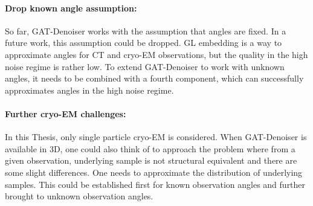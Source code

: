 \paragraph{Drop known angle assumption:}
So far, GAT-Denoiser works with the assumption that angles are fixed.
In a future work, this assumption could be dropped. GL embedding
is a way to approximate angles for CT and cryo-EM observations, but the quality in the high noise regime is rather low.
To extend GAT-Denoiser to work with unknown angles, it needs to be combined with a fourth component, 
which can successfully approximates angles in the high noise regime.

\paragraph{Further cryo-EM challenges:}
In this Thesis, only single particle cryo-EM is considered.
When GAT-Denoiser is available in 3D, one could also think of to approach
the problem where from a given observation, underlying sample is not 
structural equivalent and there are some slight differences. 
One needs to approximate the distribution of underlying samples.
This could be established first for known observation angles and further brought to unknown observation angles.

